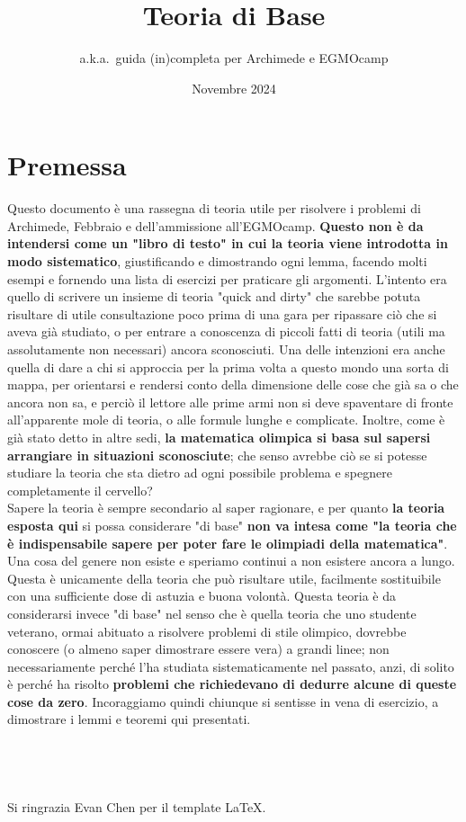 \documentclass[11pt]{scrartcl}
\begin{document}
	\title{Teoria di Base}
	\subtitle{a.k.a.\ guida (in)completa per Archimede e EGMOcamp}
	\date{Novembre 2024}
	
	
	\maketitle
	\section*{Premessa}
	Questo documento è una rassegna di teoria utile per risolvere i problemi di Archimede, Febbraio e dell'ammissione all'EGMOcamp. \textbf{Questo non è da intendersi come un "libro di testo" in cui la teoria viene introdotta in modo sistematico}, giustificando e dimostrando ogni lemma, facendo molti esempi e fornendo una lista di esercizi per praticare gli argomenti. L'intento era quello di scrivere un insieme di teoria "quick and dirty" che sarebbe potuta risultare di utile consultazione poco prima di una gara per ripassare ciò che si aveva già studiato, o per entrare a conoscenza di piccoli fatti di teoria (utili ma assolutamente non necessari) ancora sconosciuti. Una delle intenzioni era anche quella di dare a chi si approccia per la prima volta a questo mondo una sorta di mappa, per orientarsi e rendersi conto della dimensione delle cose che già sa o che ancora non sa, e perciò il lettore alle prime armi non si deve spaventare di fronte all'apparente mole di teoria, o alle formule lunghe e complicate. Inoltre, come è già stato detto in altre sedi, \textbf{la matematica olimpica si basa sul sapersi arrangiare in situazioni sconosciute}; che senso avrebbe ciò se si potesse studiare la teoria che sta dietro ad ogni possibile problema e spegnere completamente il cervello? \\
	Sapere la teoria è sempre secondario al saper ragionare, e per quanto \textbf{la teoria esposta qui} si possa considerare "di base" \textbf{non va intesa come "la teoria che è indispensabile sapere per poter fare le olimpiadi della matematica"}. Una cosa del genere non esiste e speriamo continui a non esistere ancora a lungo. Questa è unicamente della teoria che può risultare utile, facilmente sostituibile con una sufficiente dose di astuzia e buona volontà. Questa teoria è da considerarsi invece "di base" nel senso che è quella teoria che uno studente veterano, ormai abituato a risolvere problemi di stile olimpico, dovrebbe conoscere (o almeno saper dimostrare essere vera) a grandi linee; non necessariamente perché l'ha studiata sistematicamente nel passato, anzi, di solito è perché ha risolto \textbf{problemi che richiedevano di dedurre alcune di queste cose da zero}. Incoraggiamo quindi chiunque si sentisse in vena di esercizio, a dimostrare i lemmi e teoremi qui presentati. \\
	\\
	\\
	\\
	\\
	Si ringrazia Evan Chen per il template \LaTeX.
	\newpage
	\tableofcontents
	\newpage
\end{document}
